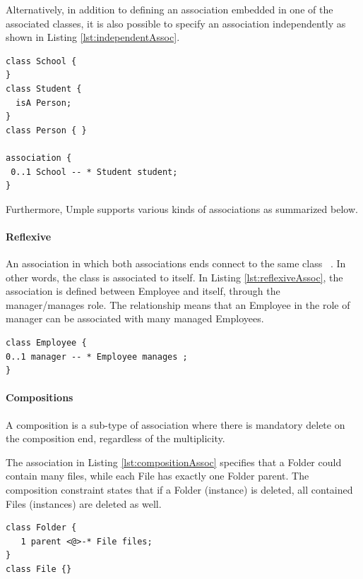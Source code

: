 Alternatively, in addition to defining an association embedded in one of the associated classes, it is also possible to specify an association independently as shown in Listing \ref{lst:independentAssoc}. 

\begin{lstlisting}[style=umplePlain, caption=An example of an independent Umple association,label=lst:independentAssoc]
class School {
}
class Student {
  isA Person;
}
class Person { }

association {
 0..1 School -- * Student student;
}
\end{lstlisting}
Furthermore, Umple supports various kinds of associations as summarized below.
\paragraph{Reflexive}
An association in which both associations ends connect to the same class ~\cite{UMLSpec}. In other words, the class is associated to itself. In Listing \ref{lst:reflexiveAssoc}, the association is defined between Employee and itself, through the manager/manages role. The relationship means that an Employee in the role of manager can be associated with many managed Employees. 

\begin{lstlisting}[style=umplePlainNumbers, caption=A Reflexive association,label=lst:reflexiveAssoc]
class Employee {
0..1 manager -- * Employee manages ;
}
\end{lstlisting}

\paragraph*{Compositions}
A composition \cite{UMLSpec} is a sub-type of association where there is mandatory delete on the composition end, regardless of the multiplicity. 

The association in Listing \ref{lst:compositionAssoc} specifies that a Folder could contain many files, while each File has exactly one Folder parent. The composition constraint states that if a Folder (instance) is deleted, all contained Files (instances) are deleted as well.
\begin{lstlisting}[style=umplePlainNumbers, caption=A Composite association,label=lst:compositionAssoc]
class Folder { 
   1 parent <@>-* File files;
}
class File {}
\end{lstlisting}

